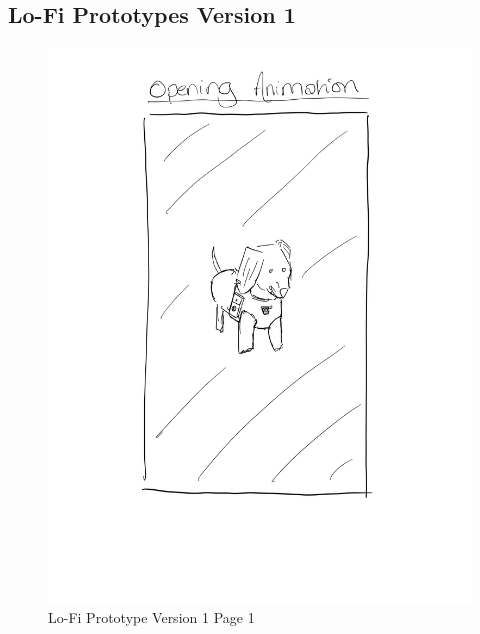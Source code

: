 \documentclass{ueacmpstyle}
\begin{document}
            \subsection{Lo-Fi Prototypes Version 1}
            \begin{figure}[h]
                
                \includegraphics[width=\linewidth]{Images/Lofi_v1_a.jpg}
                \caption{Lo-Fi Prototype Version 1 Page 1}
                \label{Figure Lofi v1 1}
            
            \end{figure}
            \clearpage
\end{document}
